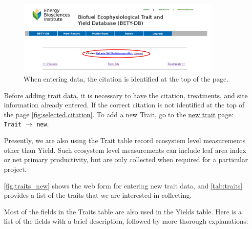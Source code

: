 \documentclass[12pt,english,portrait]{article}
\begin{document}
 \begin{figure}[htb]
   \centering
   \includegraphics[width = 4in]{selectedcitation.png}
   \caption{When entering data, the citation is identified at the top of the page.}
   \label{fig:selected.citation}
 \end{figure}

 Before adding trait data, it is necessary to have the citation, treatments, and site information already entered.
 If the correct citation is not identified at the top of the page \autoref{fig:selected.citation}.
 To add a new Trait, go to the \href{http:ebi-forecast.igb.uiuc.edu/bety/traits/new}{new trait} page: \verb+Trait+ $\to$ \verb+new+.

 Presently, we are also using the Trait table record ecosystem level measurements other than Yield.
 Such ecosystem level measurements can include leaf area index or net primary productivity, but are only collected when required for a particular project. 

 \autoref{fig:traits_new} shows the web form for entering new trait data, and \autoref{tab:traits} provides a list of the traits that we are interested in collecting.

Most of the fields in the Traits table are also used in the Yields table.
Here is a list of the fields with a brief description, followed by more thorough explanations:
\end{document}
